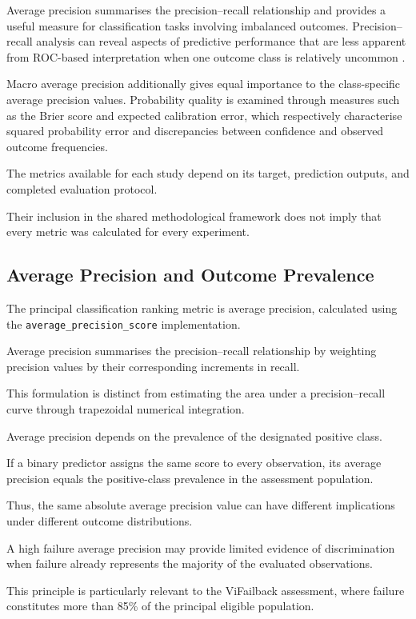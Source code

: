 Average precision summarises the precision–recall relationship and provides a useful measure for classification tasks involving imbalanced outcomes. Precision–recall analysis can reveal aspects of predictive performance that are less apparent from ROC-based interpretation when one outcome class is relatively uncommon \parencite{Saito2015PrecisionRecall}.

Macro average precision additionally gives equal importance to the class-specific average precision values. Probability quality is examined through measures such as the Brier score and expected calibration error, which respectively characterise squared probability error and discrepancies between confidence and observed outcome frequencies.

The metrics available for each study depend on its target, prediction outputs, and completed evaluation protocol.

Their inclusion in the shared methodological framework does not imply that every metric was calculated for every experiment.

\subsection{Average Precision and Outcome Prevalence}

The principal classification ranking metric is average precision, calculated using the \texttt{average\_precision\_score} implementation.

Average precision summarises the precision–recall relationship by weighting precision values by their corresponding increments in recall.

This formulation is distinct from estimating the area under a precision–recall curve through trapezoidal numerical integration.

Average precision depends on the prevalence of the designated positive class.

If a binary predictor assigns the same score to every observation, its average precision equals the positive-class prevalence in the assessment population.

Thus, the same absolute average precision value can have different implications under different outcome distributions.

A high failure average precision may provide limited evidence of discrimination when failure already represents the majority of the evaluated observations.

This principle is particularly relevant to the ViFailback assessment, where failure constitutes more than 85\% of the principal eligible population.

